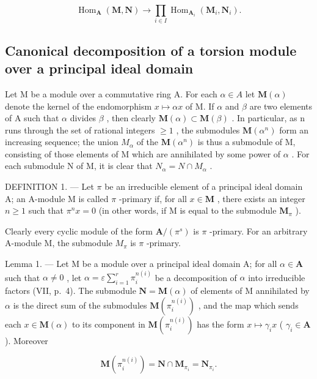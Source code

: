 \[
\operatorname{Hom} _ {\mathbf {A}} (\mathbf {M}, \mathbf {N}) \rightarrow \prod_ {i \in I} \operatorname{Hom} _ {\mathbf {A} _ {i}} (\mathbf {M} _ {i}, \mathbf {N} _ {i}).
\]

\subsection{Canonical decomposition of a torsion module over a principal ideal domain}

Let M be a module over a commutative ring A. For each \(\alpha\in A\) let \(\mathbf{M}(\alpha)\) denote the kernel of the endomorphism \(x\mapsto\alpha x\) of M. If \(\alpha\) and \(\beta\) are two elements of A such that \(\alpha\) divides \(\beta\) , then clearly \(\mathbf{M}(\alpha)\subset\mathbf{M}(\beta)\) . In particular, as n runs through the set of rational integers \(\geqslant1\) , the submodules \(\mathbf{M}(\alpha^{n})\) form an increasing sequence; the union \(M_{\alpha}\) of the \(\mathbf{M}(\alpha^{n})\) is thus a submodule of M, consisting of those elements of M which are annihilated by some power of \(\alpha\) . For each submodule N of M, it is clear that \(N_{\alpha}=N\cap M_{\alpha}\) .

DEFINITION 1. --- Let \(\pi\) be an irreducible element of a principal ideal domain A; an A-module M is called \(\pi\) -primary if, for all \(x \in \mathbf{M}\) , there exists an integer \(n \geqslant 1\) such that \(\pi^n x = 0\) (in other words, if M is equal to the submodule \(\mathbf{M}_{\pi}\) ).

Clearly every cyclic module of the form \(\mathbf{A}/(\pi^{s})\) is \(\pi\) -primary. For an arbitrary A-module M, the submodule \(M_{\pi}\) is \(\pi\) -primary.

Lemma 1. --- Let M be a module over a principal ideal domain A; for all \(\alpha \in \mathbf{A}\) such that \(\alpha \neq 0\) , let \(\alpha = \varepsilon \sum_{i=1}^{r} \pi_i^{n(i)}\) be a decomposition of \(\alpha\) into irreducible factors (VII, p.~4). The submodule \(\mathbf{N} = \mathbf{M}(\alpha)\) of elements of M annihilated by \(\alpha\) is the direct sum of the submodules \(\mathbf{M}(\pi_i^{n(i)})\) , and the map which sends each \(x \in \mathbf{M}(\alpha)\) to its component in \(\mathbf{M}(\pi_i^{n(i)})\) has the form \(x \mapsto \gamma_i x\) ( \(\gamma_i \in \mathbf{A}\) ). Moreover

\[
\mathbf {M} \left(\pi_ {i} ^ {n (i)}\right) = \mathbf {N} \cap \mathbf {M} _ {\pi_ {i}} = \mathbf {N} _ {\pi_ {i}}.
\]

